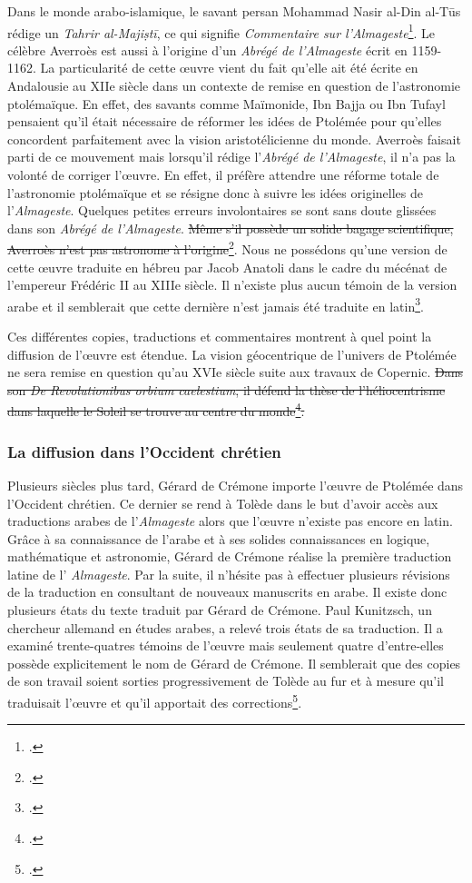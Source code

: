 Dans le monde arabo-islamique, le savant persan Mohammad Nasir al-Din al-Tūs rédige un \textit{Tahrir al-Majiṣtī}, ce qui signifie \textit{Commentaire sur l'Almageste}\footcite{universalisMOHAMMADNASIRALDIN2008}.
Le célèbre Averroès est aussi à l'origine d'un \textit{Abrégé de l'Almageste} écrit en 1159-1162.
La particularité de cette œuvre vient du fait qu'elle ait été écrite en Andalousie au XIIe siècle dans un contexte de remise en question de l'astronomie ptolémaïque.
En effet, des savants comme Maïmonide, Ibn Bajja ou Ibn Tufayl pensaient qu'il était nécessaire de réformer les idées de Ptolémée pour qu'elles concordent parfaitement avec la vision aristotélicienne du monde.
Averroès faisait parti de ce mouvement mais lorsqu'il rédige l'\textit{Abrégé de l'Almageste}, il n'a pas la volonté de corriger l'œuvre.
En effet, il préfère attendre une réforme totale de l'astronomie ptolémaïque et se résigne donc à suivre les idées originelles de l'\textit{Almageste}.
Quelques petites erreurs involontaires se sont sans doute glissées dans son \textit{Abrégé de l'Almageste}.
\st{Même s'il possède un solide bagage scientifique, Averroès n'est pas astronome à l'origine}\footcite{layAverroesAbregeDastronomie1998}.
Nous ne possédons qu'une version de cette œuvre traduite en hébreu par Jacob Anatoli dans le cadre du mécénat de l'empereur Frédéric II au XIIIe siècle.
Il n'existe plus aucun témoin de la version arabe et il semblerait que cette dernière n'est jamais été traduite en latin\footcite{layAverroesHebraicusInedit2005}.

Ces différentes copies, traductions et commentaires montrent à quel point la diffusion de l'œuvre est étendue.
La vision géocentrique de l'univers de Ptolémée ne sera remise en question qu'au XVIe siècle suite aux travaux de Copernic.
\st{Dans son \textit{De Revolutionibus orbium caelestium}, il défend la thèse de l'héliocentrisme dans laquelle le Soleil se trouve au centre du monde\footcite{verdetHELIOCENTRISME2008}.}

\subsubsection{La diffusion dans l'Occident chrétien}
Plusieurs siècles plus tard, Gérard de Crémone importe l'œuvre de Ptolémée dans l'Occident chrétien. 
Ce dernier se rend à Tolède dans le but d'avoir accès aux traductions arabes de l'\textit{Almageste} alors que l'œuvre n'existe pas encore en latin. Grâce à sa connaissance de l'arabe et à ses solides connaissances en logique, mathématique et astronomie, Gérard de Crémone réalise la première traduction latine de l' \textit{Almageste}. Par la suite, il n'hésite pas à effectuer plusieurs révisions de la traduction en consultant de nouveaux manuscrits en arabe. Il existe donc plusieurs états du texte traduit par Gérard de Crémone. Paul Kunitzsch, un chercheur allemand en études arabes, a relevé trois états de sa traduction. Il a examiné trente-quatres témoins de l'œuvre mais seulement quatre d'entre-elles possède explicitement le nom de Gérard de Crémone. Il semblerait que des copies de son travail soient sorties progressivement de Tolède au fur et à mesure qu'il traduisait l'œuvre et qu'il apportait des corrections\footcite{jacquartTraductionsAuFil2018}.


